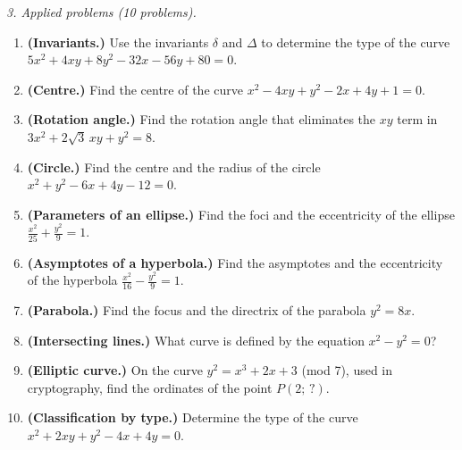 \emph{3. Applied problems (10 problems).}
\bigskip
\begin{enumerate}[label=\arabic*., leftmargin=*]
\item \textbf{(Invariants.)} Use the invariants $\delta$ and $\Delta$ to determine the type of the curve $5x^2+4xy+8y^2-32x-56y+80=0$.
\item \textbf{(Centre.)} Find the centre of the curve $x^2-4xy+y^2-2x+4y+1=0$.
\item \textbf{(Rotation angle.)} Find the rotation angle that eliminates the $xy$ term in $3x^2+2\sqrt3\,xy+y^2=8$.
\item \textbf{(Circle.)} Find the centre and the radius of the circle $x^2+y^2-6x+4y-12=0$.
\item \textbf{(Parameters of an ellipse.)} Find the foci and the eccentricity of the ellipse $\frac{x^2}{25}+\frac{y^2}{9}=1$.
\item \textbf{(Asymptotes of a hyperbola.)} Find the asymptotes and the eccentricity of the hyperbola $\frac{x^2}{16}-\frac{y^2}{9}=1$.
\item \textbf{(Parabola.)} Find the focus and the directrix of the parabola $y^2=8x$.
\item \textbf{(Intersecting lines.)} What curve is defined by the equation $x^2-y^2=0$?
\item \textbf{(Elliptic curve.)} On the curve $y^2=x^3+2x+3$ (mod 7), used in cryptography, find the ordinates of the point $P(2;\,?)$.
\item \textbf{(Classification by type.)} Determine the type of the curve $x^2+2xy+y^2-4x+4y=0$.
\end{enumerate}

